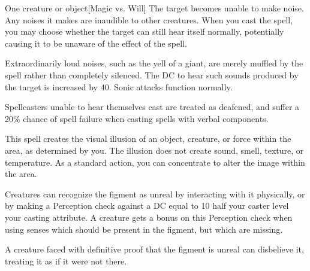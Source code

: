 \begin{spellheader}
    \spellrng{\rngmed}
    \spelldur{\durshort \dismissable}
\end{spellheader}
\begin{spelleffects}
    \begin{spelltarget}{One creature or object}[Magic vs. Will]
        \spelleffect The target becomes unable to make noise. Any noises it makes are inaudible to other creatures. When you cast the spell, you may choose whether the target can still hear itself normally, potentially causing it to be unaware of the effect of the spell.

        Extraordinarily loud noises, such as the yell of a giant, are merely muffled by the spell rather than completely silenced. The DC to hear such sounds produced by the target is increased by 40. Sonic attacks function normally.
    \end{spelltarget}
\end{spelleffects}
\begin{spellfooter}
    \spellnotes Spellcasters unable to hear themselves cast are treated as deafened, and suffer a 20\% chance of spell failure when casting spells with verbal components.
\end{spellfooter}

\begin{spellheader}
    \spelldur{\durshort}
\end{spellheader}
\begin{spelleffects}
    \spellline
    \spelleffect This spell creates the visual illusion of an object, creature, or force within the area, as determined by you. The illusion does not create sound, smell, texture, or temperature. As a standard action, you can concentrate to alter the image within the area.
\end{spelleffects}
\begin{spellfooter}
    \spellnotes Creatures can recognize the figment as unreal by interacting with it physically, or by making a Perception check against a DC equal to 10 \add half your caster level \add your casting attribute. A creature gets a  bonus on this Perception check when using senses which should be present in the figment, but which are missing.

    A creature faced with definitive proof that the figment is unreal can disbelieve it, treating it as if it were not there.
\end{spellfooter}

